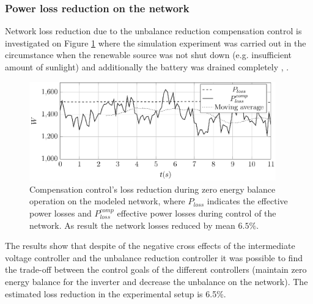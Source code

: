         \subsubsection{Power loss reduction on the network}

             Network loss reduction due to the unbalance reduction compensation control is investigated on Figure \ref{fig:compare_power} where the simulation experiment was carried out in the circumstance when the renewable source was not shut down (e.g. insufficient amount of sunlight) and additionally the battery was drained completely  \cite{Neukirchner2015}, \cite{neukirchner2015examination}.

            \begin{figure}[ht]
            \centering
            \includegraphics[width=0.95\textwidth]{Unblance_EPS_Pics/UnbalRedComp_JCP-figure6.eps}
            \caption{Compensation control's loss reduction during zero energy balance operation on the modeled network, where $P_{loss}$ indicates the effective power losses and $P^{comp}_{loss}$ effective power losses during control of the network. As result the network losses reduced by mean $6.5\%$.}
            \label{fig:compare_power}
            \end{figure}

            The results show that despite of the negative cross effects of the intermediate voltage controller and the unbalance reduction controller it was possible to find the trade-off between the control goals of the different controllers (maintain zero energy balance for the inverter and decrease the unbalance on the network). The estimated loss reduction in the experimental setup is 6.5\%.

